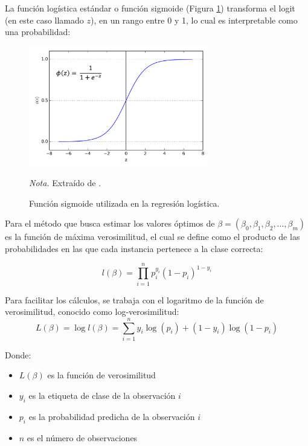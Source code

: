 La función logística estándar o función sigmoide (Figura \ref{fig:sigmoid_function}) 
transforma el logit (en este caso llamado $z$), en un rango entre 0 y 1, lo cual es interpretable como una probabilidad:
\begin{figure}[H]
    \centering
    \caption{Función sigmoide utilizada en la regresión logística.}
    \includegraphics[width=0.7\textwidth]{img/4_marco_teorico/sigmoid_function.png}
    \label{fig:sigmoid_function}
    \begin{flushleft}
        \textit{Nota.} Extraído de \citet{farrukh_modeling_2019}. 
        \vspace{-\baselineskip}       
    \end{flushleft}
\end{figure}

Para \citet{hosmer2013applied} el método que busca estimar los valores óptimos de $\beta = (\beta_{0}, \beta_{1}, \beta_{2}, ..., \beta_{m})$ 
es la función de máxima verosimilitud, el cual se define como el producto de las probabilidades en las que cada instancia 
pertenece a la clase correcta:

\begin{equation}
    l(\beta) = \prod_{i=1}^{n} p_{i}^{y_{i}}(1 - p_{i})^{1 - y_{i}}
    \label{eq:likelihood}
\end{equation}

Para facilitar los cálculos, se trabaja con el logaritmo de la función de verosimilitud, conocido como log-verosimilitud:
\begin{equation}
    L(\beta) = \log l(\beta) = \sum_{i=1}^{n} y_{i} \log(p_{i}) + (1 - y_{i}) \log(1 - p_{i})
\end{equation}

Donde:
\begin{itemize}
    \item $L(\beta)$ es la función de verosimilitud
    \item $y_{i}$ es la etiqueta de clase de la observación $i$
    \item $p_{i}$ es la probabilidad predicha de la observación $i$
    \item $n$ es el número de observaciones
\end{itemize}

